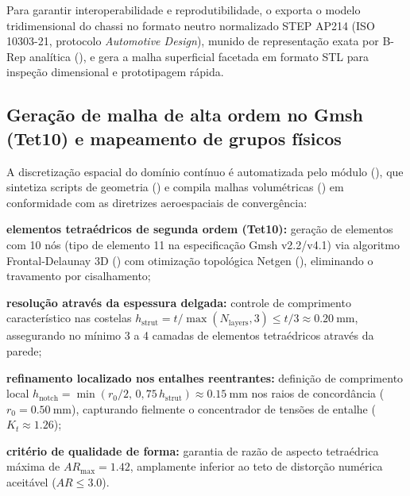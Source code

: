 Para garantir interoperabilidade e reprodutibilidade, o  exporta o modelo tridimensional do chassi no formato neutro normalizado STEP AP214 (ISO 10303-21, protocolo \textit{Automotive Design}), munido de representação exata por B-Rep analítica (), e gera a malha superficial facetada em formato STL para inspeção dimensional e prototipagem rápida.

\subsection{Geração de malha de alta ordem no Gmsh (Tet10) e mapeamento de grupos físicos}
\label{subsec:gmsh-tet10}

A discretização espacial do domínio contínuo é automatizada pelo módulo  (), que sintetiza scripts de geometria () e compila malhas volumétricas () em conformidade com as diretrizes aeroespaciais de convergência:
\begin{alineas}
  \item \textbf{elementos tetraédricos de segunda ordem (Tet10):} geração de elementos com 10 nós (tipo de elemento 11 na especificação Gmsh v2.2/v4.1) via algoritmo Frontal-Delaunay 3D () com otimização topológica Netgen (), eliminando o travamento por cisalhamento;
  \item \textbf{resolução através da espessura delgada:} controle de comprimento característico nas costelas $h_{\text{strut}} = t / \max(N_{\text{layers}}, 3) \le t / 3 \approx \SI{0.20}{\milli\metre}$, assegurando no mínimo 3 a 4 camadas de elementos tetraédricos através da parede;
  \item \textbf{refinamento localizado nos entalhes reentrantes:} definição de comprimento local $h_{\text{notch}} = \min(r_0 / 2,\, 0{,}75\, h_{\text{strut}}) \approx \SI{0.15}{\milli\metre}$ nos raios de concordância ($r_0 = \SI{0.50}{\milli\metre}$), capturando fielmente o concentrador de tensões de entalhe ($K_t \approx \num{1.26}$);
  \item \textbf{critério de qualidade de forma:} garantia de razão de aspecto tetraédrica máxima de $AR_{\max} = \num{1.42}$, amplamente inferior ao teto de distorção numérica aceitável ($AR \le \num{3.0}$).
\end{alineas}

